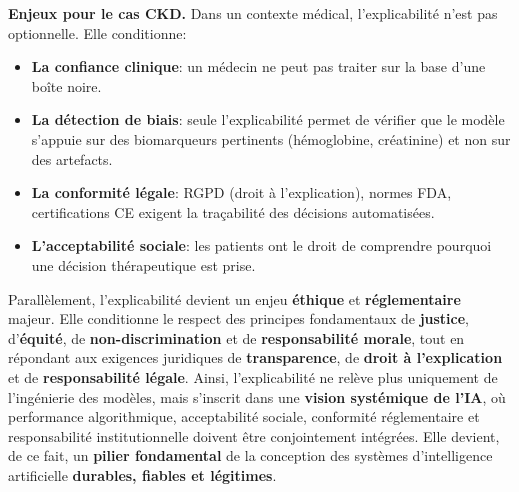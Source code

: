 \vspace{4pt}

\textbf{Enjeux pour le cas CKD.}
Dans un contexte médical, l'explicabilité n'est pas optionnelle. Elle conditionne:
\begin{itemize}
    \item \textbf{La confiance clinique}: un médecin ne peut pas traiter sur la base d'une boîte noire.
    \item \textbf{La détection de biais}: seule l'explicabilité permet de vérifier que le modèle s'appuie sur des biomarqueurs pertinents (hémoglobine, créatinine) et non sur des artefacts.
    \item \textbf{La conformité légale}: RGPD (droit à l'explication), normes FDA, certifications CE exigent la traçabilité des décisions automatisées.
    \item \textbf{L'acceptabilité sociale}: les patients ont le droit de comprendre pourquoi une décision thérapeutique est prise.
\end{itemize}

\vspace{4pt}

Parallèlement, l’explicabilité devient un enjeu \textbf{éthique} et \textbf{réglementaire} majeur. Elle conditionne le respect des principes fondamentaux de \textbf{justice}, d’\textbf{équité}, de \textbf{non-discrimination} et de \textbf{responsabilité morale}, tout en répondant aux exigences juridiques de \textbf{transparence}, de \textbf{droit à l’explication} et de \textbf{responsabilité légale}. Ainsi, l’explicabilité ne relève plus uniquement de l’ingénierie des modèles, mais s’inscrit dans une \textbf{vision systémique de l’IA}, où performance algorithmique, acceptabilité sociale, conformité réglementaire et responsabilité institutionnelle doivent être conjointement intégrées. Elle devient, de ce fait, un \textbf{pilier fondamental} de la conception des systèmes d’intelligence artificielle \textbf{durables, fiables et légitimes}.
